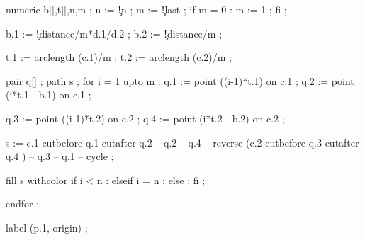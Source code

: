   numeric b[],t[],n,m ;
  n := \visualcounterparameter\c!n ;
  m := \visualcounterparameter\c!last ;
  if m = 0 : m := 1 ; fi ;

  b.1 := \visualcounterparameter\c!distance/m*d.1/d.2 ;
  b.2 := \visualcounterparameter\c!distance/m ;

  t.1 := arclength (c.1)/m ;
  t.2 := arclength (c.2)/m ;

  pair q[] ;
  path s ;
  for i = 1 upto m : 
    q.1 := point ((i-1)*t.1)        on c.1 ;
    q.2 := point (i*t.1 - b.1)  on c.1 ;

    q.3 := point ((i-1)*t.2)        on c.2 ;
    q.4 := point (i*t.2 - b.2)  on c.2 ;

    s := c.1 cutbefore q.1 cutafter q.2 -- q.2 -- q.4
       -- reverse (c.2 cutbefore q.3 cutafter q.4 ) -- q.3 -- q.1 
       -- cycle ;

    fill s withcolor 
      if i < n     :  
      elseif i = n : 
      else         : 
      fi ;

  endfor ;

  label (p.1, origin) ;

\stopuseMPgraphic

\protect

